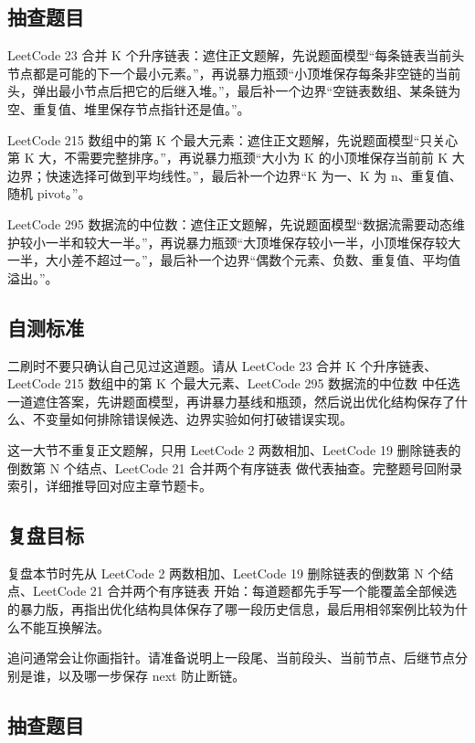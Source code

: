 \subsection{抽查题目}

LeetCode 23 合并 K 个升序链表：遮住正文题解，先说题面模型“每条链表当前头节点都是可能的下一个最小元素。”，再说暴力瓶颈“小顶堆保存每条非空链的当前头，弹出最小节点后把它的后继入堆。”，最后补一个边界“空链表数组、某条链为空、重复值、堆里保存节点指针还是值。”。

LeetCode 215 数组中的第 K 个最大元素：遮住正文题解，先说题面模型“只关心第 K 大，不需要完整排序。”，再说暴力瓶颈“大小为 K 的小顶堆保存当前前 K 大边界；快速选择可做到平均线性。”，最后补一个边界“K 为一、K 为 n、重复值、随机 pivot。”。

LeetCode 295 数据流的中位数：遮住正文题解，先说题面模型“数据流需要动态维护较小一半和较大一半。”，再说暴力瓶颈“大顶堆保存较小一半，小顶堆保存较大一半，大小差不超过一。”，最后补一个边界“偶数个元素、负数、重复值、平均值溢出。”。

\subsection{自测标准}

二刷时不要只确认自己见过这道题。请从 LeetCode 23 合并 K 个升序链表、LeetCode 215 数组中的第 K 个最大元素、LeetCode 295 数据流的中位数 中任选一道遮住答案，先讲题面模型，再讲暴力基线和瓶颈，然后说出优化结构保存了什么、不变量如何排除错误候选、边界实验如何打破错误实现。

这一大节不重复正文题解，只用 LeetCode 2 两数相加、LeetCode 19 删除链表的倒数第 N 个结点、LeetCode 21 合并两个有序链表 做代表抽查。完整题号回附录索引，详细推导回对应主章节题卡。

\subsection{复盘目标}

复盘本节时先从 LeetCode 2 两数相加、LeetCode 19 删除链表的倒数第 N 个结点、LeetCode 21 合并两个有序链表 开始：每道题都先手写一个能覆盖全部候选的暴力版，再指出优化结构具体保存了哪一段历史信息，最后用相邻案例比较为什么不能互换解法。

追问通常会让你画指针。请准备说明上一段尾、当前段头、当前节点、后继节点分别是谁，以及哪一步保存 next 防止断链。

\subsection{抽查题目}

